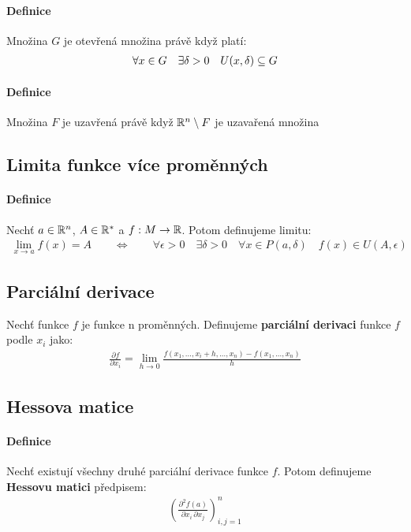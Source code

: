 \documentclass[a4paper,10pt]{article}
\begin{document}
\paragraph{Definice}
Množina $G$ je otevřená množina právě když platí:
\begin{align*}
	\forall x \in G \quad \exists \delta > 0 \quad U(x, \delta) \subseteq G
\end{align*}
\paragraph{Definice}
Množina $F$ je uzavřená právě když $\mathbb{R}^n \setminus F$ je uzavařená množina

\subsection{Limita funkce více proměnných}
\setcounter{equation}{0}
\paragraph{Definice}
Nechť $a \in \mathbb{R}^n$, $A \in \mathbb{R}^*$ a $f: M \to \mathbb{R}$. Potom definujeme limitu:
\begin{align*}
	\lim_{x\to a} f(x) = A \qquad
	\Leftrightarrow  \qquad
	\forall \epsilon > 0 \quad \exists \delta > 0 \quad \forall x \in P(a,
	\delta) \quad f(x) \in U(A, \epsilon)
\end{align*}

\subsection{Parciální derivace}
\setcounter{equation}{0}
Nechť funkce $f$ je funkce n proměnných. Definujeme \textbf{parciální derivaci}
funkce $f$ podle $x_i$ jako:
\begin{align*}
	\frac{\partial f}{\partial x_i} = \lim_{h \to 0} \frac{f(x_1, ..., x_i + h,
	..., x_n) - f(x_1, ..., x_n)}{h}
\end{align*}

\subsection{Hessova matice}
\setcounter{equation}{0}
\paragraph{Definice}
Nechť existují všechny druhé parciální derivace funkce $f$. Potom definujeme
\textbf{Hessovu matici} předpisem:
\begin{align*}
	\left( \frac{\partial^2 f(a)}{\partial x_i \, \partial x_j} \right)_{i,j=1}^n
\end{align*}
\end{document}
